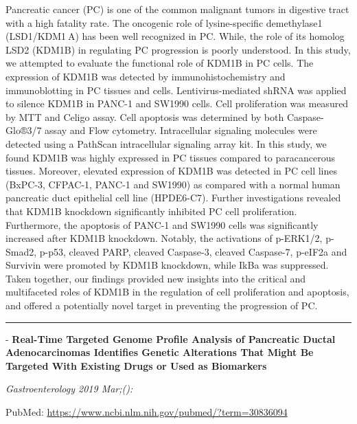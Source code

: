 \documentclass[]{article}
\begin{document}
Pancreatic cancer (PC) is one of the common malignant tumors in
digestive tract with a high fatality rate. The oncogenic role of
lysine-specific demethylase1 (LSD1/KDM1 A) has been well recognized in
PC. While, the role of its homolog LSD2 (KDM1B) in regulating PC
progression is poorly understood. In this study, we attempted to
evaluate the functional role of KDM1B in PC cells. The expression of
KDM1B was detected by immunohistochemistry and immunoblotting in PC
tissues and cells. Lentivirus-mediated shRNA was applied to silence
KDM1B in PANC-1 and SW1990 cells. Cell proliferation was measured by MTT
and Celigo assay. Cell apoptosis was determined by both Caspase-Glo®3/7
assay and Flow cytometry. Intracellular signaling molecules were
detected using a PathScan intracellular signaling array kit. In this
study, we found KDM1B was highly expressed in PC tissues compared to
paracancerous tissues. Moreover, elevated expression of KDM1B was
detected in PC cell lines (BxPC-3, CFPAC-1, PANC-1 and SW1990) as
compared with a normal human pancreatic duct epithelial cell line
(HPDE6-C7). Further investigations revealed that KDM1B knockdown
significantly inhibited PC cell proliferation. Furthermore, the
apoptosis of PANC-1 and SW1990 cells was significantly increased after
KDM1B knockdown. Notably, the activations of p-ERK1/2, p-Smad2, p-p53,
cleaved PARP, cleaved Caspase-3, cleaved Caspase-7, p-eIF2a and Survivin
were promoted by KDM1B knockdown, while IkBa was suppressed. Taken
together, our findings provided new insights into the critical and
multifaceted roles of KDM1B in the regulation of cell proliferation and
apoptosis, and offered a potentially novel target in preventing the
progression of PC.

{}

{}

\begin{center}\rule{0.5\linewidth}{\linethickness}\end{center}

 - \textbf{Real-Time Targeted Genome Profile Analysis of Pancreatic
Ductal Adenocarcinomas Identifies Genetic Alterations That Might Be
Targeted With Existing Drugs or Used as Biomarkers}

\emph{Gastroenterology 2019 Mar;():}

PubMed: \url{https://www.ncbi.nlm.nih.gov/pubmed/?term=30836094}
\end{document}
